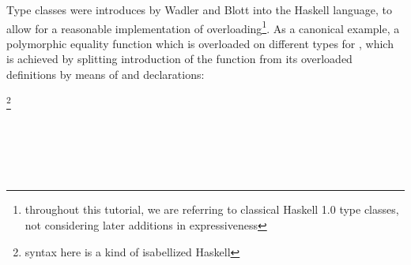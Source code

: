 %
\begin{isabellebody}%
\def\isabellecontext{Classes}%
%
\isadelimtheory
\isanewline
%
\endisadelimtheory
%
\isatagtheory
%
\endisatagtheory
{\isafoldtheory}%
%
\isadelimtheory
%
\endisadelimtheory
%
\isadelimML
%
\endisadelimML
%
\isatagML
%
\endisatagML
{\isafoldML}%
%
\isadelimML
%
\endisadelimML
%
\isadelimML
%
\endisadelimML
%
\isatagML
%
\endisatagML
{\isafoldML}%
%
\isadelimML
%
\endisadelimML
%
\isamarkuptrue%
%
\isamarkuptrue%
%
\begin{isamarkuptext}%
Type classes were introduces by Wadler and Blott \cite{wadler89how}
  into the Haskell language, to allow for a reasonable implementation
  of overloading\footnote{throughout this tutorial, we are referring
  to classical Haskell 1.0 type classes, not considering
  later additions in expressiveness}.
  As a canonical example, a polymorphic equality function
   which is overloaded on different
  types for \isa{{\isasymalpha}}, which is achieved by splitting introduction
  of the  function from its overloaded definitions by means
  of  and  declarations:

  \medskip\noindent\hspace*{2ex}\footnote{syntax here is a kind of isabellized Haskell} \\
  \hspace*{4ex}

  \medskip\noindent\hspace*{2ex} \\
  \hspace*{4ex} \\
  \hspace*{4ex} \\
  \hspace*{4ex} \\
  \hspace*{4ex}


\end{isamarkuptext}
\end{isabellebody}
